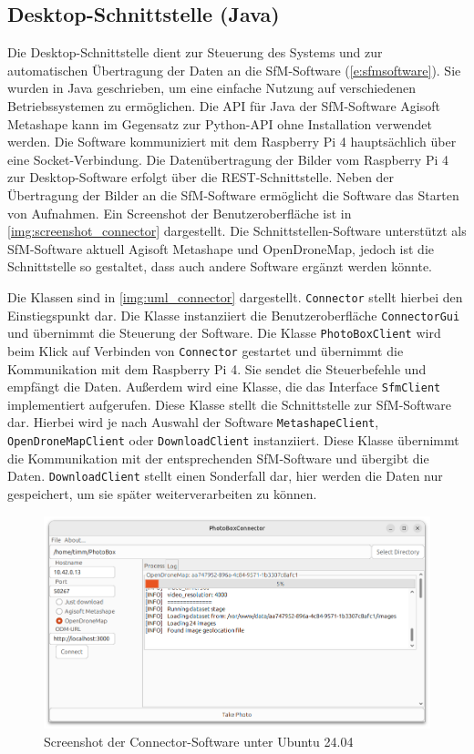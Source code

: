 \documentclass[./00PhotoBox.tex]{subfiles}
\begin{document}
\subsection{Desktop-Schnittstelle (Java)}
Die Desktop-Schnittstelle dient zur Steuerung des Systems und zur automatischen Über\-tragung der Daten an die \Gls{SfM}-Software (\autoref{e:sfmsoftware}). Sie wurden in Java geschrieben, um eine einfache Nutzung auf verschiedenen Betriebssystemen zu ermöglichen. Die \Gls{API} für Java der \Gls{SfM}-Software Agisoft Metashape kann im Gegensatz zur Python-\Gls{API} ohne Installation verwendet werden. Die Software kommuniziert mit dem Raspberry Pi 4 hauptsächlich über eine \Gls{Socket}-Verbindung. Die Datenübertragung der Bilder vom Raspberry Pi 4 zur Desktop-Software erfolgt über die \Gls{REST}-Schnittstelle. Neben der Übertragung der Bilder an die \Gls{SfM}-Software ermöglicht die Software das Starten von Aufnahmen. Ein Screenshot der Benutzeroberfläche ist in \autoref{img:screenshot_connector} dargestellt. Die Schnittstellen-Software unterstützt als \Gls{SfM}-Software aktuell Agisoft Metashape und OpenDroneMap, jedoch ist die Schnittstelle so gestaltet, dass auch andere Software ergänzt werden könnte.

Die Klassen sind in \autoref{img:uml_connector} dargestellt. \texttt{Connector} stellt hierbei den Einstiegspunkt dar. Die Klasse instanziiert die Benutzeroberfläche \texttt{ConnectorGui} und übernimmt die Steuerung der Software. Die Klasse \texttt{PhotoBoxClient} wird beim Klick auf Verbinden von \texttt{Connector} gestartet und übernimmt die Kommunikation mit dem Raspberry Pi 4. Sie sendet die Steuerbefehle und empfängt die Daten. Außerdem wird eine Klasse, die das Interface \texttt{SfmClient} implementiert aufgerufen. Diese Klasse stellt die Schnittstelle zur \Gls{SfM}-Software dar. Hierbei wird je nach Auswahl der Software \texttt{MetashapeClient}, \texttt{OpenDroneMapClient} oder \texttt{DownloadClient} instanziiert. Diese Klasse übernimmt die Kommunikation mit der entsprechenden \Gls{SfM}-Software und übergibt die Daten. \texttt{DownloadClient} stellt einen Sonderfall dar, hier werden die Daten nur gespeichert, um sie später weiterverarbeiten zu können.

\begin{figure}
    \centering
    \includegraphics[width=1\textwidth]{./img/connector_screenshot.png}
    \caption{Screenshot der Connector-Software unter Ubuntu 24.04} %
    \label{img:screenshot_connector} %
\end{figure}
\end{document}
